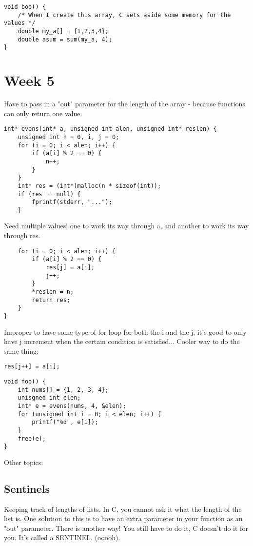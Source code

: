 \documentclass[12pt]{article}
\theoremstyle{definition}
\begin{document}
\begin{lstlisting}
void boo() {
    /* When I create this array, C sets aside some memory for the values */
    double my_a[] = {1,2,3,4};
    double asum = sum(my_a, 4);
}
\end{lstlisting}
\section{Week 5}
\note Have to pass in a "out" parameter for the length of the array - because functions can only return one value. 

\begin{lstlisting}
int* evens(int* a, unsigned int alen, unsigned int* reslen) {
    unsigned int n = 0, i, j = 0;
    for (i = 0; i < alen; i++) {
        if (a[i] % 2 == 0) {
            n++;
        }
    }
    int* res = (int*)malloc(n * sizeof(int));
    if (res == null) {
        fprintf(stderr, "...");
    }
\end{lstlisting}
\note Need multiple values! one to work its way through a, and another to work its way through res. 
\begin{lstlisting}
    for (i = 0; i < alen; i++) {
        if (a[i] % 2 == 0) {
            res[j] = a[i];
            j++;
        }
        *reslen = n;
        return res;
    }
}
\end{lstlisting}
Improper to have some type of for loop for both the i and the j, it's good to only have j increment when the certain condition is satisfied... 
\note Cooler way to do the same thing:
\begin{lstlisting}
res[j++] = a[i];
\end{lstlisting}

\begin{lstlisting}
void foo() {
    int nums[] = {1, 2, 3, 4};
    unisgned int elen;
    int* e = evens(nums, 4, &elen);
    for (unsigned int i = 0; i < elen; i++) {
        printf("%d", e[i]);
    }
    free(e);
}    
\end{lstlisting}

Other topics:
\subsection{Sentinels}
Keeping track of lengths of lists. In C, you cannot ask it what the length of the list is. One solution to this is to have an extra parameter in your function as an "out" parameter. There is another way! You still have to do it, C doesn't do it for you. It's called a SENTINEL. (ooooh).
\end{document}
